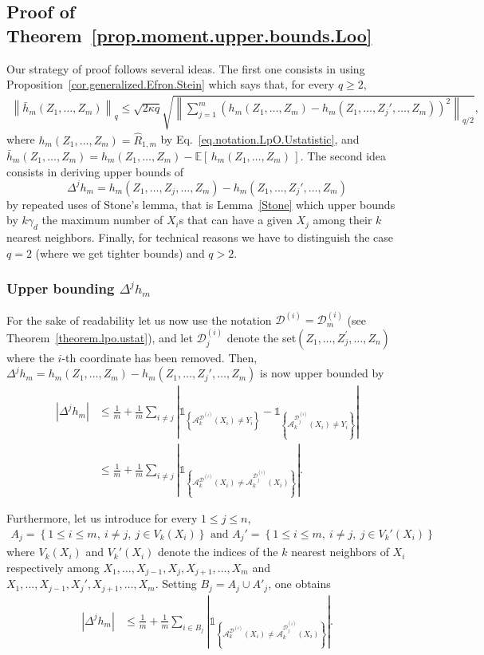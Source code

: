\documentclass[twoside,11pt]{article}
\numberwithin{equation}{section}
\newcommand{\ga}[1]{\left\{#1\right\}}
\newcommand{\1}{\mathds{1}}%
\newcommand{\ind}[1]{\1_{\ga{#1}}}%
\newcommand{\paren}[1]{\left( #1 \right)}
\newcommand{\croch}[1]{\left[\, #1 \,\right]}
\newcommand{\acc}[1]{\left\{ #1 \right\}}
\newcommand{\norm}[1]{\left\| #1 \right\|}
\newcommand{\abs}[1]{\left\lvert #1 \right\rvert} %
\newcommand{\E}{\mathbb{E}}
\newcommand{\Rh}{\widehat{R}}
\newcommand{\D}{\mathcal{D}}
\newcommand{\A}{\mathcal{A}}
\numberwithin{equation}{section}
\theoremstyle{plain}
\begin{document}
\subsection{Proof of Theorem~\ref{prop.moment.upper.bounds.Loo}}
\label{Appendix: BorneMomentLpO.kNN}
%
Our strategy of proof follows several ideas.
%
The first one consists in using Proposition~\ref{cor.generalized.Efron.Stein} which says that, for every $q\geq 2$,
\begin{align*}
\norm{ \bar h_m(Z_1,\ldots,Z_m) }_q \leq \sqrt{2\kappa q} \sqrt{ \norm{ \sum_{j=1}^m \paren{ h_m(Z_1,\ldots,Z_m)-h_m(Z_1,\ldots,Z_j',\ldots,Z_m) }^2  }_{q/2}  },
\end{align*}
where $h_m(Z_1,\ldots,Z_m) = \Rh_{1,m} $ by Eq.~\eqref{eq.notation.LpO.Ustatistic}, and $ \bar h_m(Z_1,\ldots,Z_m) = h_m(Z_1,\ldots,Z_m) - \E\croch{h_m(Z_1,\ldots,Z_m)}$.
%
The second idea consists in deriving upper bounds of
%
$$\Delta^j h_m = h_m(Z_1,\ldots,Z_j,\ldots,Z_m)-h_m(Z_1,\ldots,Z_j',\ldots,Z_m)$$
%
by repeated uses of Stone's lemma, that is Lemma~\ref{Stone} which upper bounds by $k\gamma_d$ the maximum number of $X_i$s that can have a given $X_j$ among their $k$ nearest neighbors.
%
Finally, for technical reasons we have to distinguish the case $q=2$ (where we get tighter bounds) and $q>2$.





\subsubsection{Upper bounding $\Delta^j h_m$}
%
For the sake of readability let us now use the notation $\D^{(i)}= \D_m^{(i)}$ (see Theorem~\ref{theorem.lpo.ustat}), and let $\D_j^{(i)}$ denote the set$\paren{Z_1,\ldots,Z_j^\prime,\ldots,Z_n}$ where the $i$-th coordinate has been removed.
%
Then, $\Delta^j h_m = h_m(Z_1,\ldots,Z_m)-h_m(Z_1,\ldots,Z_j',\ldots,Z_m)$ is now upper bounded by
\begin{align}
\abs{ \Delta^j h_m }
%
& \leq \frac{1}{m} + \frac{1}{m} \sum_{i\neq j} \abs{ \ind{ \A_k^{\D^{(i)}}\paren{ X_i }\neq Y_i  } - \ind{  \A_k^{\D_j^{(i)}}\paren{ X_i } \neq Y_i }  } \nonumber\\
%
& \leq \frac{1}{m} + \frac{1}{m} \sum_{i\neq j} \abs{ \ind{ \A_k^{\D^{(i)}}\paren{X_i } \neq \A_k^{\D_j^{(i)}}\paren{X_i} }  } . %
\end{align}

Furthermore, let us introduce for every $1\leq j\leq n$,
\begin{align*}
  A_j = \acc{ 1\leq i\leq m,\ i\neq j,\ j \in V_k(X_i)} \text{ and } A_j' = \acc{ 1\leq i\leq m,\ i\neq j,\ j \in V_k'(X_i)}
\end{align*}
where $V_k(X_i)$ and $V_k'(X_i)$ denote the indices of the $k$ nearest neighbors of $X_i$ respectively among $X_1,\ldots,X_{j-1},X_{j},X_{j+1},\ldots,X_m$ and $X_1,...,X_{j-1},X_{j}',X_{j+1},\ldots,X_m$.
%
Setting $  B_{j} = A_j\cup A'_j $, one obtains
\begin{align} \label{maj.diff.hj_hjp}
\abs{  \Delta^j h_m }
& \leq \frac{1}{m} + \frac{1}{m} \sum_{i \in B_j} \abs{ \ind{ \A_k^{\D^{(i)}}\paren{X_i } \neq \A_k^{\D_j^{(i)}}\paren{X_i} }  } .
\end{align}
\end{document}
